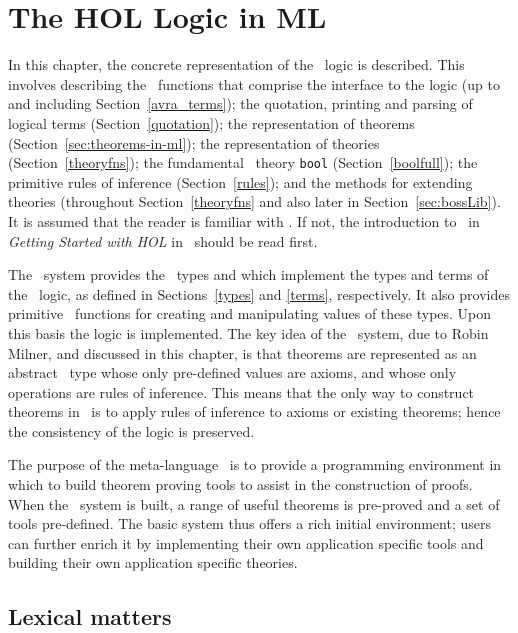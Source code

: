 \chapter{The HOL Logic in ML}\label{HOLsyschapter}

In this chapter, the concrete representation of the \HOL\ logic is
described.  This involves describing the \ML\ functions that comprise
the interface to the logic (up to and including
Section~\ref{avra_terms}); the quotation, printing and parsing of
logical terms (Section~\ref{quotation}); the representation of
theorems (Section~\ref{sec:theorems-in-ml}); the representation of theories
(Section~\ref{theoryfns}); the fundamental \HOL\ theory \texttt{bool}
(Section~\ref{boolfull}); the primitive rules of inference
(Section~\ref{rules}); and the methods for extending theories
(throughout Section~\ref{theoryfns} and also later in
Section~\ref{sec:bossLib}).  It is assumed that the reader is familiar
with \ML.  If not, the introduction to \ML\ in {\sl Getting Started
with HOL\/} in \TUTORIAL\ should be read first.

The \HOL\ system provides the \ML\ types  and 
which implement the types and terms of the \HOL\ logic, as defined in
Sections~\ref{types} and \ref{terms}, respectively. It also provides
primitive \ML\ functions for creating and manipulating values of these
types. Upon this basis the \HOL{} logic is implemented. The key idea
of the \HOL\ system, due to Robin Milner, and
discussed in this chapter, is that theorems are represented as an
abstract \ML\ type whose only pre-defined values are axioms, and whose
only operations are rules of inference. This means that the only way
to construct theorems in \HOL\ is to apply rules of inference to
axioms or existing theorems; hence the consistency of the logic is
preserved.

The purpose of the meta-language \ML\ is to provide a programming
environment in which to build theorem proving tools to assist in the
construction of proofs.  When the \HOL\ system is built, a range of
useful theorems is pre-proved and a set of tools pre-defined. The basic
system thus offers a rich initial environment; users can further enrich
it by implementing their own application specific tools and building
their own application specific theories.


\section{Lexical matters}\label{HOL-lex}

